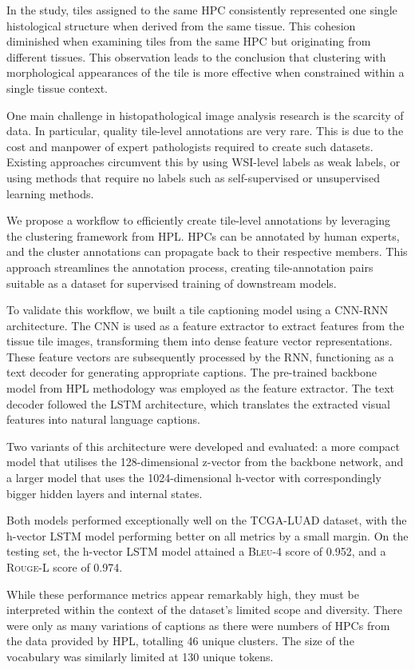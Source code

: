 \documentclass{l4proj}
\begin{document}
In the study, tiles assigned to the same HPC consistently represented one single histological structure when derived from the same tissue. This cohesion diminished when examining tiles from the same HPC but originating from different tissues. This observation leads to the conclusion that clustering with morphological appearances of the tile is more effective when constrained within a single tissue context.

One main challenge in histopathological image analysis research is the scarcity of data. In particular, quality tile-level annotations are very rare. This is due to the cost and manpower of expert pathologists required to create such datasets. Existing approaches circumvent this by using WSI-level labels as weak labels, or using methods that require no labels such as self-supervised or unsupervised learning methods.

We propose a workflow to efficiently create tile-level annotations by leveraging the clustering framework from HPL. HPCs can be annotated by human experts, and the cluster annotations can propagate back to their respective members. This approach streamlines the annotation process, creating tile-annotation pairs suitable as a dataset for supervised training of downstream models.

To validate this workflow, we built a tile captioning model using a CNN-RNN architecture. The CNN is used as a feature extractor to extract features from the tissue tile images, transforming them into dense feature vector representations. These feature vectors are subsequently processed by the RNN, functioning as a text decoder for generating appropriate captions. The pre-trained backbone model from HPL methodology was employed as the feature extractor. The text decoder followed the LSTM architecture, which translates the extracted visual features into natural language captions.

Two variants of this architecture were developed and evaluated: a more compact model that utilises the 128-dimensional z-vector from the backbone network, and a larger model that uses the 1024-dimensional h-vector with correspondingly bigger hidden layers and internal states.

Both models performed exceptionally well on the TCGA-LUAD dataset, with the h-vector LSTM model performing better on all metrics by a small margin. On the testing set, the h-vector LSTM model attained a \textsc{Bleu-4} score of 0.952, and a \textsc{Rouge-L} score of 0.974. 

While these performance metrics appear remarkably high, they must be interpreted within the context of the dataset's limited scope and diversity. There were only as many variations of captions as there were numbers of HPCs from the data provided by HPL, totalling 46 unique clusters. The size of the vocabulary was similarly limited at 130 unique tokens.
\end{document}
